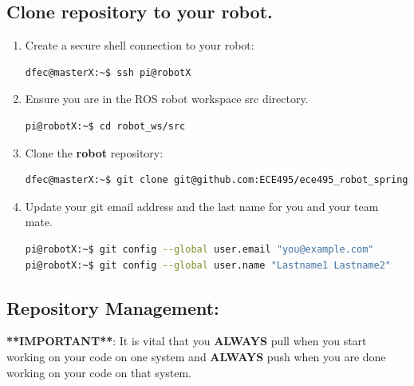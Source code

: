 \documentclass{handout}
\begin{document}
\subsection{Clone repository to your robot.}
\begin{enumerate}
	\item Create a secure shell connection to your robot:
\begin{lstlisting}[language=bash]
dfec@masterX:~$ ssh pi@robotX
\end{lstlisting}
\item Ensure you are in the ROS robot workspace src directory.
\begin{lstlisting}[language=bash]
pi@robotX:~$ cd robot_ws/src
\end{lstlisting}
	\item Clone the \textbf{robot} repository:
\begin{lstlisting}[language=bash]
dfec@masterX:~$ git clone git@github.com:ECE495/ece495_robot_spring2022-USERNAME.git
\end{lstlisting}

\item Update your git email address and the last name for you and your team mate.
\begin{lstlisting}[language=bash]
pi@robotX:~$ git config --global user.email "you@example.com"
pi@robotX:~$ git config --global user.name "Lastname1 Lastname2"
\end{lstlisting}
\end{enumerate}

\subsection{Repository Management:}
\textbf{**IMPORTANT**}: It is vital that you \textbf{ALWAYS} pull when you start working on your code on one system and \textbf{ALWAYS} push when you are done working on your code on that system.
\end{document}
